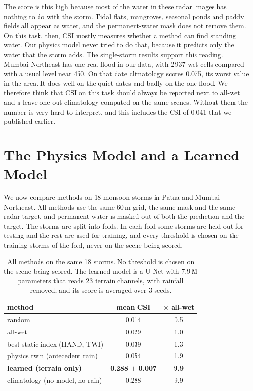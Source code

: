 \documentclass[conference]{IEEEtran}
\begin{document}
The score is this high because most of the water in these radar images has nothing to do with the
storm. Tidal flats, mangroves, seasonal ponds and paddy fields all appear as water, and the
permanent-water mask does not remove them. On this task, then, CSI mostly measures whether a method
can find standing water. Our physics model never tried to do that, because it predicts only the
water that the storm adds. The single-storm results support this reading. Mumbai-Northeast has one
real flood in our data, with 2\,937 wet cells compared with a usual level near 450. On that date
climatology scores 0.075, its worst value in the area. It does well on the quiet dates and badly on
the one flood. We therefore think that CSI on this task should always be reported next to all-wet
and a leave-one-out climatology computed on the same scenes. Without them the number is very hard to
interpret, and this includes the CSI of 0.041 that we published earlier.

\section{The Physics Model and a Learned Model}
\label{sec:twin}
We now compare methods on 18 monsoon storms in Patna and Mumbai-Northeast. All methods use the same
60\,m grid, the same mask and the same radar target, and permanent water is masked out of both the
prediction and the target. The storms are split into folds. In each fold some storms are held out
for testing and the rest are used for training, and every threshold is chosen on the training
storms of the fold, never on the scene being scored.

\begin{table}[!t]
\centering
\caption{All methods on the same 18 storms. No threshold is chosen on the scene being scored. The
learned model is a U-Net with 7.9\,M parameters that reads 23 terrain channels, with rainfall
removed, and its score is averaged over 3 seeds.}
\label{tab:baselines}
\begin{tabular}{lcc}
\toprule
method & mean CSI & $\times$ all-wet \\
\midrule
random                          & 0.014 & 0.5 \\
all-wet                         & 0.029 & 1.0 \\
best static index (HAND, TWI)   & 0.039 & 1.3 \\
physics twin (antecedent rain)  & 0.054 & 1.9 \\
\midrule
\textbf{learned (terrain only)} & \textbf{0.288 $\pm$ 0.007} & \textbf{9.9} \\
climatology (no model, no rain) & 0.288 & 9.9 \\
\bottomrule
\end{tabular}
\end{table}
\end{document}
